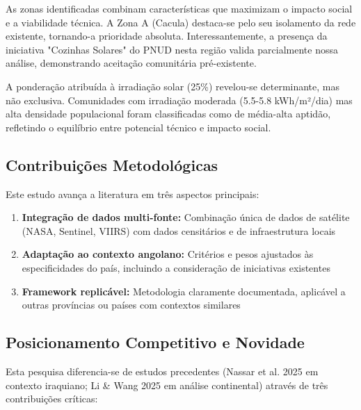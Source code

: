 \documentclass[12pt, a4paper]{article}
\begin{document}
As zonas identificadas combinam características que maximizam o impacto social e a viabilidade técnica. A Zona A (Cacula) destaca-se pelo seu isolamento da rede existente, tornando-a prioridade absoluta. Interessantemente, a presença da iniciativa "Cozinhas Solares" do PNUD nesta região valida parcialmente nossa análise, demonstrando aceitação comunitária pré-existente.

A ponderação atribuída à irradiação solar (25\%) revelou-se determinante, mas não exclusiva. Comunidades com irradiação moderada (5.5-5.8 kWh/m²/dia) mas alta densidade populacional foram classificadas como de média-alta aptidão, refletindo o equilíbrio entre potencial técnico e impacto social.

\subsection{Contribuições Metodológicas}

Este estudo avança a literatura em três aspectos principais:
\begin{enumerate}
    \item \textbf{Integração de dados multi-fonte:} Combinação única de dados de satélite (NASA, Sentinel, VIIRS) com dados censitários e de infraestrutura locais
    \item \textbf{Adaptação ao contexto angolano:} Critérios e pesos ajustados às especificidades do país, incluindo a consideração de iniciativas existentes
    \item \textbf{Framework replicável:} Metodologia claramente documentada, aplicável a outras províncias ou países com contextos similares
\end{enumerate}

\subsection{Posicionamento Competitivo e Novidade}

Esta pesquisa diferencia-se de estudos precedentes (Nassar et al. 2025 em contexto iraquiano; Li \& Wang 2025 em análise continental) através de três contribuições críticas:
\end{document}
